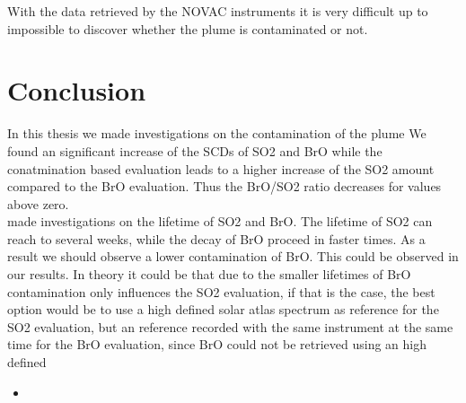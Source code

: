 \documentclass  [
  paper    = a4,
  BCOR     = 10mm,
  twoside,
  fontsize = 12pt,
  fleqn,
  toc      = bibnumbered,
  toc      = listofnumbered,
  numbers  = noendperiod,
  headings = normal,
  listof   = leveldown,
  version  = 3.03
]                                       {scrreprt}
\begin{document}
	  With the data retrieved by the NOVAC instruments it is very difficult up to impossible to discover whether the plume is contaminated or not. 




	\chapter{Conclusion}
	In this thesis we made investigations on the contamination of the plume 
	We found an significant increase of the SCDs of SO2 and BrO while the conatmination based evaluation leads to a higher increase of the SO2 amount compared to the BrO evaluation. Thus the BrO/SO2 ratio decreases for values above zero.\\
	\cite{geeignete quelle, irgendwo hab ich das schon gehoert} made investigations on the lifetime of SO2 and BrO. The lifetime of SO2 can reach to several weeks, while the decay of BrO proceed in faster times. As a result we should observe a lower contamination of BrO. This could be observed in our results. In theory it could be that due to the smaller lifetimes of BrO contamination only influences the SO2 evaluation, if that is the case, the best option would be to use a high defined solar atlas spectrum as reference for the SO2 evaluation, but an reference recorded with the same instrument at the same time for the BrO evaluation, since BrO could not be retrieved using an high defined 
	\begin{itemize}
		\item 
	\end{itemize}
	
	
	
\end{document}

